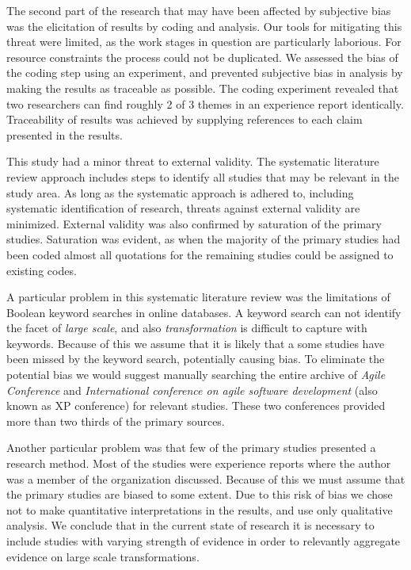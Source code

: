The second part of the research that may have been affected by subjective bias
was the elicitation of results by coding and analysis. Our tools for mitigating
this threat were limited, as the work stages in question are particularly
laborious. For resource constraints the process could not be duplicated. We
assessed the bias of the coding step using an experiment, and prevented
subjective bias in analysis by making the results as traceable as possible. The
coding experiment revealed that two researchers can find roughly 2 of 3 themes
in an experience report identically. Traceability of results was achieved by
supplying references to each claim presented in the results.

This study had a minor threat to external validity. The systematic literature
review approach includes steps to identify all studies that may be relevant in
the study area. As long as the systematic approach is adhered to, including
systematic identification of research, threats against external validity are
minimized. External validity was also confirmed by saturation of the primary
studies. Saturation was evident, as when the majority of the primary studies had
been coded almost all quotations for the remaining studies could be assigned to
existing codes.

A particular problem in this systematic literature review was the limitations of
Boolean keyword searches in online databases. A keyword search can not identify
the facet of \emph{large scale}, and also \emph{transformation} is difficult to
capture with keywords. Because of this we assume that it is likely that a some
studies have been missed by the keyword search, potentially causing bias. To
eliminate the potential bias we would suggest manually searching the entire
archive of \emph{Agile Conference} and \emph{International conference on agile
software development} (also known as XP conference) for relevant studies.
These two conferences provided more than two thirds of the primary sources.

Another particular problem was that few of the primary studies presented a
research method. Most of the studies were experience reports where the author
was a member of the organization discussed. Because of this we must assume that
the primary studies are biased to some extent. Due to this risk of bias we chose
not to make quantitative interpretations in the results, and use only
qualitative analysis. We conclude that in the current state of research it is
necessary to include studies with varying strength of evidence in order to
relevantly aggregate evidence on large scale transformations.

